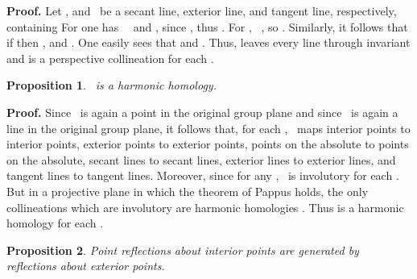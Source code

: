 \documentclass[a4paper,twoside,12pt]{article}
\newtheorem{prop}{Proposition}[section]
\newenvironment{proof}{\medskip \noindent 
            {\bf Proof.}}{ \hfill \myHighlight{$\square$}\coordHE{} \medskip}
\begin{document}
\begin{proof}
     Let \coordHE{}, and \coordHE{}\ be a secant line,
exterior line, and tangent line, respectively, containing \coordHE{} For 
\coordHE{} one has \coordHE{}\ \coordHE{}\ and \coordHE{}, since \coordHE{},
thus \coordHE{}. For \coordHE{}, \coordHE{}\ \coordHE{}, so 
\coordHE{}. Similarly, it follows that if \coordHE{}
then \coordHE{}, and \coordHE{}. One easily
sees that \coordHE{} and \coordHE{}.
Thus, \coordHE{} leaves every line through \coordHE{} invariant and \coordHE{}
is a perspective collineation for each \coordHE{}.
\end{proof}

\begin{prop} \coordHE{}\ is a harmonic homology.
\end{prop}

\begin{proof} Since \coordHE{}\ is again a point in the original group plane
and since \coordHE{}\ is again a line in the original group plane, 
it follows that, for each 
\coordHE{}, \coordHE{}\ maps interior points to interior points,
exterior points to exterior points, points on the absolute to points
on the absolute, secant lines to secant lines, exterior lines to
exterior lines, and tangent lines to tangent lines.  Moreover, since
\coordHE{} for any \coordHE{}, \coordHE{}\ is
involutory for each \coordHE{}. But in a projective plane in
which the theorem of Pappus holds, the only collineations which are
involutory are harmonic homologies \cite{BK}. Thus \coordHE{} is a
harmonic homology for each \coordHE{}.
\end{proof}

\begin{prop} Point reflections about interior points are generated
by reflections about exterior points.
\end{prop}
\end{document}
